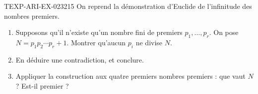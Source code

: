 \begin{exercice}{TEXP-ARI-EX-023}{2}{15}
On reprend la démonstration d'Euclide de l'infinitude des nombres premiers.
\begin{enumerate}
  \item Supposons qu'il n'existe qu'un nombre fini de premiers
        $p_1,\dots,p_r$. On pose $N=p_1p_2\cdots p_r+1$. Montrer qu'aucun $p_i$
        ne divise $N$.
  \item En déduire une contradiction, et conclure.
  \item Appliquer la construction aux quatre premiers nombres premiers : que
        vaut $N$ ? Est-il premier ?
\end{enumerate}
\end{exercice}
